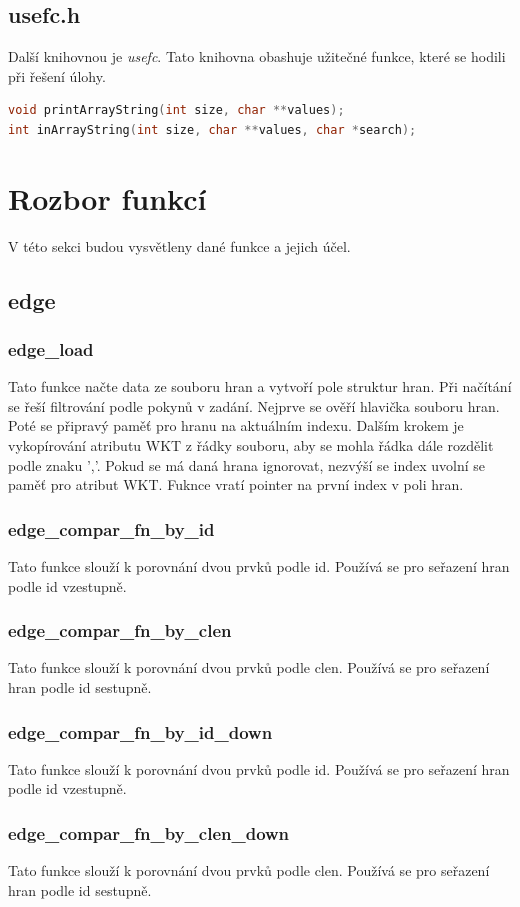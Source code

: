 \documentclass[12pt, a4paper]{report}
\begin{document}
\subsection{usefc.h}
Další knihovnou je \emph{usefc}. Tato knihovna obashuje užitečné funkce, které se hodili při řešení úlohy.
\begin{lstlisting}[language=C]
void printArrayString(int size, char **values);
int inArrayString(int size, char **values, char *search);
\end{lstlisting}

\newpage
\section{Rozbor funkcí}
V této sekci budou vysvětleny dané funkce a jejich účel.
%
%
%
%
\subsection{edge}
%
%
%
\subsubsection{edge\_load}
Tato funkce načte data ze souboru hran a vytvoří pole struktur hran. Při načítání se řeší filtrování podle pokynů v zadání. Nejprve se ověří hlavička souboru hran. Poté se připravý paměť pro hranu na aktuálním indexu. Dalším krokem je vykopírování atributu WKT z řádky souboru, aby se mohla řádka dále rozdělit podle znaku ','. Pokud se má daná hrana ignorovat, nezvýší se index uvolní se paměť pro atribut WKT. Fuknce vratí pointer na první index v poli hran.
%
%
%
\subsubsection{edge\_compar\_fn\_by\_id}
Tato funkce slouží k porovnání dvou prvků podle id. Používá se pro seřazení hran podle id vzestupně.
%
%
%
\subsubsection{edge\_compar\_fn\_by\_clen}
Tato funkce slouží k porovnání dvou prvků podle clen. Používá se pro seřazení hran podle id sestupně.
%
%
%
\subsubsection{edge\_compar\_fn\_by\_id\_down}
Tato funkce slouží k porovnání dvou prvků podle id. Používá se pro seřazení hran podle id vzestupně.
%
%
%
\subsubsection{edge\_compar\_fn\_by\_clen\_down}
Tato funkce slouží k porovnání dvou prvků podle clen. Používá se pro seřazení hran podle id sestupně.
%
%
%
\end{document}
